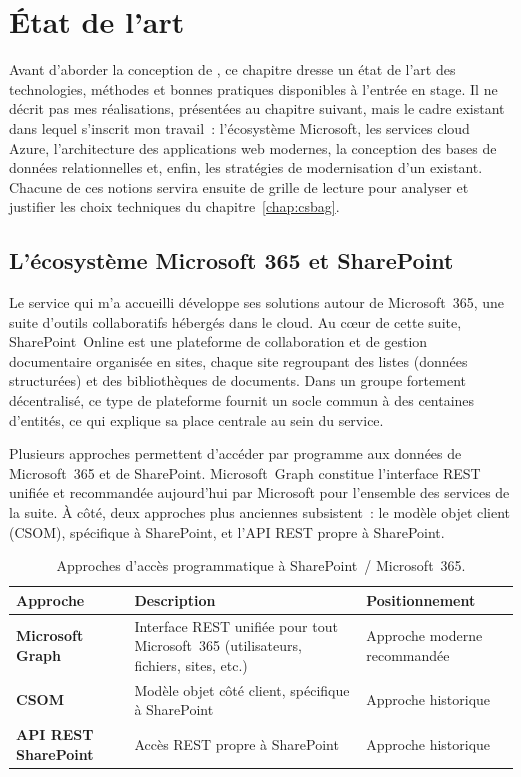 \chapter{État de l'art}
\label{chap:etat-art}

Avant d'aborder la conception de \csbag, ce chapitre dresse un état de l'art des
technologies, méthodes et bonnes pratiques disponibles à l'entrée en stage. Il
ne décrit pas mes réalisations, présentées au chapitre suivant, mais le cadre
existant dans lequel s'inscrit mon travail~: l'écosystème Microsoft, les
services cloud Azure, l'architecture des applications web modernes, la
conception des bases de données relationnelles et, enfin, les stratégies de
modernisation d'un existant. Chacune de ces notions servira ensuite de grille de
lecture pour analyser et justifier les choix techniques du
chapitre~\ref{chap:csbag}.

\section{L'écosystème Microsoft 365 et SharePoint}
\label{sec:m365}

Le service qui m'a accueilli développe ses solutions autour de Microsoft~365,
une suite d'outils collaboratifs hébergés dans le cloud. Au cœur
de cette suite, SharePoint~Online est une plateforme de collaboration et de
gestion documentaire organisée en sites, chaque site regroupant des listes
(données structurées) et des bibliothèques de documents.
Dans un groupe fortement décentralisé, ce type de plateforme fournit un socle
commun à des centaines d'entités, ce qui explique sa place centrale au sein du
service.

Plusieurs approches permettent d'accéder par programme aux données de
Microsoft~365 et de SharePoint. Microsoft~Graph constitue l'interface REST
unifiée et recommandée aujourd'hui par Microsoft pour l'ensemble des services
de la suite. À côté, deux approches plus anciennes subsistent~:
le modèle objet client (CSOM), spécifique à SharePoint, et l'API REST propre à
SharePoint.

\begin{table}[H]
  \centering
  \caption{Approches d'accès programmatique à SharePoint~/ Microsoft~365.}
  \label{tab:sp-acces}
  \begin{tabularx}{\textwidth}{>{\bfseries}p{3.4cm} X p{2.9cm}}
    \toprule
    \normalfont\bfseries Approche & \bfseries Description & \bfseries Positionnement \\
    \midrule
    Microsoft Graph & Interface REST unifiée pour tout Microsoft~365
      (utilisateurs, fichiers, sites, etc.) & Approche moderne recommandée \\
    CSOM & Modèle objet côté client, spécifique à SharePoint & Approche
      historique \\
    API REST SharePoint & Accès REST propre à SharePoint & Approche historique \\
    \bottomrule
  \end{tabularx}
\end{table}

